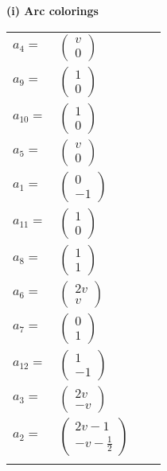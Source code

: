 \documentclass[1p]{elsarticle_modified}
\theoremstyle{definition}
\begin{document}
\flushleft \textbf{(i) Arc colorings}\\
\begin{tabular}{m{7pt} m{180pt} m{7pt} m{180pt} }
\flushright $a_{4}=$&$\begin{pmatrix}v\\0\end{pmatrix}$ \\
\flushright $a_{9}=$&$\begin{pmatrix}1\\0\end{pmatrix}$ \\
\flushright $a_{10}=$&$\begin{pmatrix}1\\0\end{pmatrix}$ \\
\flushright $a_{5}=$&$\begin{pmatrix}v\\0\end{pmatrix}$ \\
\flushright $a_{1}=$&$\begin{pmatrix}0\\-1\end{pmatrix}$ \\
\flushright $a_{11}=$&$\begin{pmatrix}1\\0\end{pmatrix}$ \\
\flushright $a_{8}=$&$\begin{pmatrix}1\\1\end{pmatrix}$ \\
\flushright $a_{6}=$&$\begin{pmatrix}2 v\\v\end{pmatrix}$ \\
\flushright $a_{7}=$&$\begin{pmatrix}0\\1\end{pmatrix}$ \\
\flushright $a_{12}=$&$\begin{pmatrix}1\\-1\end{pmatrix}$ \\
\flushright $a_{3}=$&$\begin{pmatrix}2 v\\- v\end{pmatrix}$ \\
\flushright $a_{2}=$&$\begin{pmatrix}2 v-1\\- v-\frac{1}{2}\end{pmatrix}$\\&\end{tabular}
\end{document}
